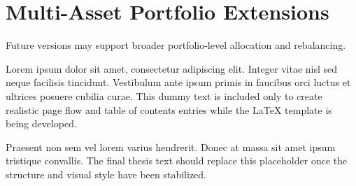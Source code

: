 \section{Multi-Asset Portfolio Extensions}

Future versions may support broader portfolio-level allocation and rebalancing.

Lorem ipsum dolor sit amet, consectetur adipiscing elit. Integer vitae nisl sed neque facilisis tincidunt. Vestibulum ante ipsum primis in faucibus orci luctus et ultrices posuere cubilia curae. This dummy text is included only to create realistic page flow and table of contents entries while the LaTeX template is being developed.

Praesent non sem vel lorem varius hendrerit. Donec at massa sit amet ipsum tristique convallis. The final thesis text should replace this placeholder once the structure and visual style have been stabilized.

